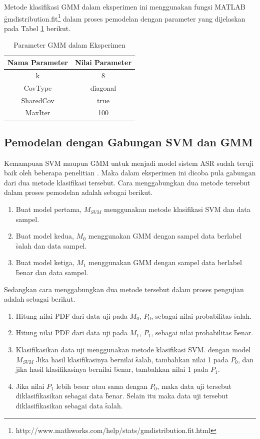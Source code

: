   Metode klasifikasi GMM dalam eksperimen ini menggunakan fungsi MATLAB \f{gmdistribution.fit}\footnote{http://www.mathworks.com/help/stats/gmdistribution.fit.html} dalam proses pemodelan dengan parameter yang dijelaskan pada Tabel \ref{table:parametergmm} berikut.

  \begin{table}
    \centering
    \caption{Parameter GMM dalam Eksperimen}
    \begin{tabular}{|c|c|}
      \hline
      \textbf{Nama Parameter} & \textbf{Nilai Parameter} \\ \hline
      k & 8 \\ \hline
      CovType & diagonal \\ \hline
      SharedCov & true \\ \hline
      MaxIter & 100 \\ \hline
    \end{tabular}
    \label{table:parametergmm}
  \end{table}



  \subsection{Pemodelan dengan Gabungan SVM dan GMM}
	Kemampuan SVM maupun GMM untuk menjadi model sistem ASR sudah teruji baik oleh beberapa penelitian \citep{zahra2013unique}. Maka dalam eksperimen ini dicoba pula gabungan dari dua metode klasifikasi tersebut. Cara menggabungkan dua metode tersebut dalam proses pemodelan adalah sebagai berikut.
	\begin{enumerate}
    \item Buat model pertama, $M_{SVM}$ menggunakan metode klasifikasi SVM dan data sampel.
    \item Buat model kedua, $M_0$ menggunakan GMM dengan sampel data berlabel \f{salah} dan data sampel.
    \item Buat model ketiga, $M_1$ menggunakan GMM dengan sampel data berlabel \f{benar} dan data sampel.
  \end{enumerate}
  Sedangkan cara menggabungkan dua metode tersebut dalam proses pengujian adalah sebagai berikut.
  \begin{enumerate}
    \item Hitung nilai PDF dari data uji pada $M_0$, $P_0$, sebagai nilai probabilitas \f{salah}.
    \item Hitung nilai PDF dari data uji pada $M_1$, $P_1$, sebagai nilai probabilitas \f{benar}.
    \item Klasifikasikan data uji menggunakan metode klasifikasi SVM. dengan model $M_{SVM}$ Jika hasil klasifikasinya bernilai \f{salah}, tambahkan nilai 1 pada $P_0$, dan jika hasil klasifikasinya bernilai \f{benar}, tambahkan nilai 1 pada $P_1$.
    \item Jika nilai $P_1$ lebih besar atau sama dengan $P_0$, maka data uji tersebut diklasifikasikan sebagai data \f{benar}. Selain itu maka data uji tersebut diklasifikasikan sebagai data \f{salah}.
  \end{enumerate}



